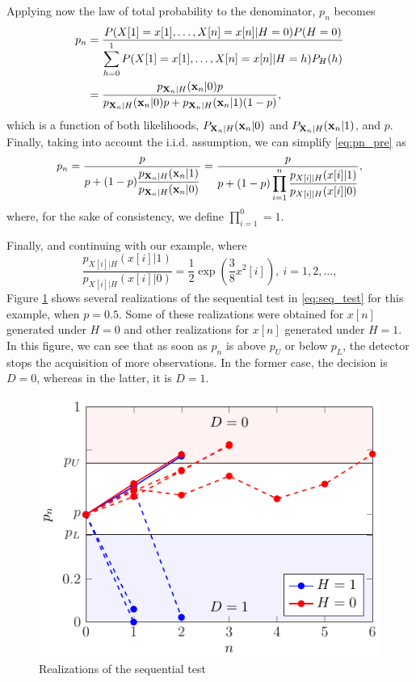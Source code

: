 Applying now the law of total probability to the denominator, $p_n$ becomes
\begin{align}
	p_n &= \frac{P(X[1] = x[1], \ldots, X[n] = x[n] | H = 0) P(H = 0)}{\displaystyle \sum_{h = 0}^{1} P(X[1] = x[1], \ldots, X[n] = x[n] | H = h) P_H(h)} \nonumber \\ &= 
	\frac{p_{\mathbf{X}_n | H}({\mathbf x}_n | 0) p}{p_{\mathbf{X}_n | H}({\mathbf x}_n | 0) p + p_{\mathbf{X}_n | H}({\mathbf x}_n | 1) (1 - p)}, \label{eq:pn_pre}
\end{align}
which is a function of both likelihoods, $P_{\mathbf{X}_n | H}({\mathbf x}_n | 0)$ and $P_{\mathbf{X}_n | H}({\mathbf x}_n | 1)$, and $p$. Finally, taking into account the i.i.d. assumption, we can simplify \eqref{eq:pn_pre} as
\begin{equation}
	\label{eq:pn}
	p_n = \frac{p}{\displaystyle p +  (1 - p) \frac{p_{\mathbf{X}_n | H}({\mathbf x}_n | 1)}{p_{\mathbf{X}_n | H}({\mathbf x}_n | 0)}} = \frac{p}{\displaystyle p +  (1 - p) \prod_{i = 1}^{n} \frac{p_{X[i] | H}(x[i] | 1)}{p_{X[i] | H}(x[i] | 0)}},
\end{equation}
where, for the sake of consistency, we define $\prod_{i = 1}^{0} = 1$.

Finally, and continuing with our example, where
\begin{equation*}
	\frac{p_{X[i] | H}(x[i] | 1)}{p_{X[i] | H}(x[i] | 0)} = \frac{1}{2} \exp \left(\frac{3 }{8} x^2[i] \right), \ i = 1, 2, \ldots,
\end{equation*}
Figure \ref{fig:seq_test_realizations} shows several realizations of the sequential test in \eqref{eq:seq_test} for this example, when $p = 0.5$. Some of these realizations were obtained for $x[n]$ generated under $H = 0$ and other realizations for  $x[n]$ generated under $H = 1$. In this figure, we can see that as soon as $p_n$ is above $p_U$ or below $p_L$, the detector stops the acquisition of more observations. In the former case, the decision is $D = 0$, whereas in the latter, it is $D = 1$.
\begin{figure}[t]
	\begin{center}
		\includegraphics{Figures/seq_test_realizations}
	\end{center}
	\caption{Realizations of the sequential test}
	\label{fig:seq_test_realizations}
\end{figure}

